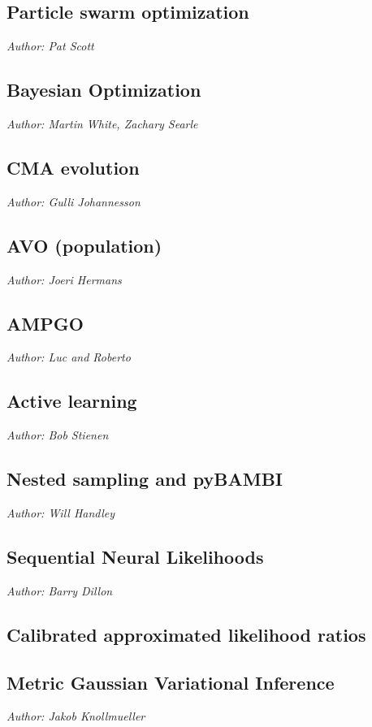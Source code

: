 \documentclass[12pt]{JHEP3}
\begin{document}
\subsection{Particle swarm optimization}
\emph{Author: Pat Scott}

\subsection{Bayesian Optimization}

\emph{Author: Martin White, Zachary Searle}

\subsection{CMA evolution}
\emph{Author: Gulli Johannesson}

\subsection{AVO (population)}
\emph{Author: Joeri Hermans}

\subsection{AMPGO}
\emph{Author: Luc and Roberto} 

\subsection{Active learning}
\emph{Author: Bob Stienen}

\subsection{Nested sampling and pyBAMBI}

\emph{Author: Will Handley}

\subsection{Sequential Neural Likelihoods}
\emph{Author: Barry Dillon}

\subsection{Calibrated approximated likelihood ratios}

\subsection{Metric Gaussian Variational Inference}
\emph{Author: Jakob Knollmueller}
\end{document}
